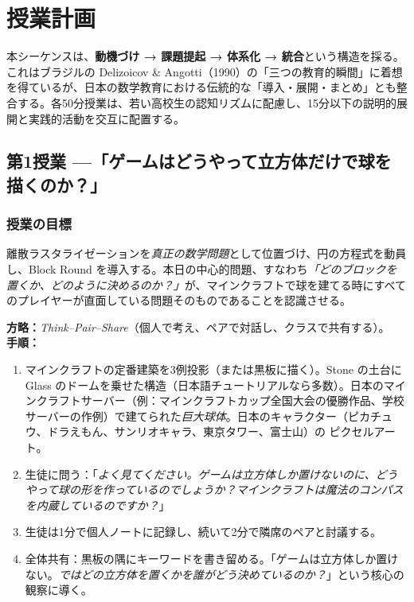 \documentclass[12pt,a4paper]{scrartcl}
\newcommand{\acc}[1]{\textcolor{accent}{\textbf{#1}}}
\newcommand{\tempo}[1]{\textnormal{\footnotesize\color{bg!90!white}\textsf{#1}}}
\begin{document}
\section{授業計画}\label{sec:sequencia}

本シーケンスは、\acc{動機づけ → 課題提起 → 体系化 → 統合}という構造を採る。これはブラジルの Delizoicov \& Angotti（1990）の「三つの教育的瞬間」に着想を得ているが、日本の数学教育における伝統的な「導入・展開・まとめ」とも整合する。各50分授業は、若い高校生の認知リズムに配慮し、15分以下の説明的展開と実践的活動を交互に配置する。

\subsection{第1授業 ---「ゲームはどうやって立方体だけで球を描くのか？」}\label{aula1}

\subsubsection*{授業の目標}
離散ラスタライゼーションを\emph{真正の数学問題}として位置づけ、円の方程式を動員し、Block Round を導入する。本日の中心的問題、すなわち\emph{「どのブロックを置くか、どのように決めるのか？」}が、マインクラフトで球を建てる時にすべてのプレイヤーが直面している問題そのものであることを認識させる。

\begin{katsudou}[1.1 --- 動機づけ \quad\tempo{10分}]
\textbf{方略：}\emph{Think--Pair--Share}（個人で考え、ペアで対話し、クラスで共有する）。 \\[0.4em]
\textbf{手順：}
\begin{enumerate}[leftmargin=1.5em,itemsep=0.2em,topsep=0.3em,nosep]
  \item マインクラフトの定番建築を3例投影（または黒板に描く）。Stone の土台に Glass のドームを乗せた構造（日本語チュートリアルなら多数）。日本のマインクラフトサーバー（例：マインクラフトカップ全国大会の優勝作品、学校サーバーの作例）で建てられた\emph{巨大球体}。日本のキャラクター（ピカチュウ、ドラえもん、サンリオキャラ、東京タワー、富士山）の ピクセルアート。
  \item 生徒に問う：「\emph{よく見てください。ゲームは立方体しか置けないのに、どうやって球の形を作っているのでしょうか？マインクラフトは魔法のコンパスを内蔵しているのですか？}」
  \item 生徒は1分で個人ノートに記録し、続いて2分で隣席のペアと討議する。
  \item 全体共有：黒板の隅にキーワードを書き留める。「ゲームは立方体しか置けない。\emph{ではどの立方体を置くかを誰がどう決めているのか？}」という核心の観察に導く。
\end{enumerate}
\end{katsudou}
\end{document}
